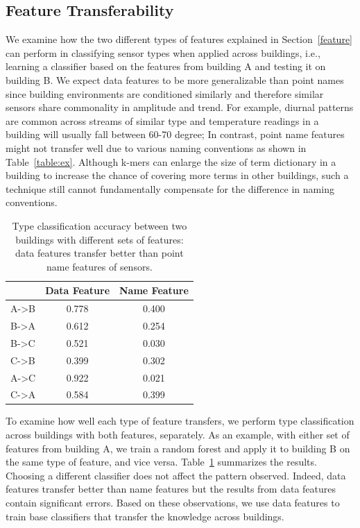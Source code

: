 \subsection{Feature Transferability}
We examine how the two different types of features explained in Section~\ref{feature} can perform in classifying sensor types when applied across buildings, i.e., learning a classifier based on the features from building A and testing it on building B. 
We expect data features to be more generalizable than point names since 
building environments are conditioned similarly and therefore similar sensors 
share commonality in amplitude and trend.
For example, diurnal patterns are common across streams of similar type and 
temperature readings in a building will usually fall between 60-70 degree; 
In contrast, point name features might not transfer well due to various naming conventions as shown in Table~\ref{table:ex}.
Although k-mers can enlarge the size of term dictionary in a building to increase the chance of covering more terms in other buildings, such a technique still cannot fundamentally compensate for the difference in naming conventions.


\begin{table}[h]
\centering
\begin{tabular}{l|c|c}
\hline
                & Data Feature & Name Feature \\ \hline
A-\textgreater B & 0.778       & 0.400       \\
B-\textgreater A & 0.612       & 0.254       \\ \hline
B-\textgreater C & 0.521       & 0.030       \\
C-\textgreater B & 0.399       & 0.302       \\ \hline
A-\textgreater C & 0.922       & 0.021       \\
C-\textgreater A & 0.584       & 0.399       \\ \hline
\end{tabular}
\caption{Type classification accuracy between two buildings with different sets of features: data features transfer better than point name features of sensors.}
\label{table:clf}
\end{table}


To examine how well each type of feature transfers, we perform type classification across buildings with both features, separately.   
As an example, with either set of features from building A, we train a random forest and apply it to building B on the same type of feature, and vice versa. 
Table~\ref{table:clf} summarizes the results. Choosing a different classifier does not affect the pattern observed.
Indeed, data features transfer better than name features but the results from data features contain significant errors. 
Based on these observations, we use data features to train base classifiers that transfer the knowledge across buildings.

